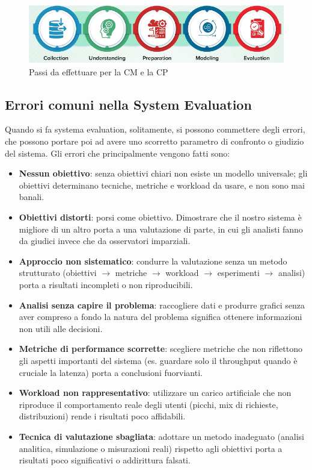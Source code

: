 \begin{figure}
    \includegraphics[width=.8\textwidth]{img/passi_CMCP.png}
    \centering
    \caption{Passi da effettuare per la CM e la CP}\label{img:passi}
\end{figure}

\subsection{Errori comuni nella System Evaluation}
Quando si fa systema evaluation, solitamente, si possono commettere degli errori, che possono portare poi ad avere uno scorretto parametro di confronto o giudizio del sistema. Gli errori che principalmente vengono fatti sono:
\begin{itemize}
  \item \textbf{Nessun obiettivo}: senza obiettivi chiari non esiste un modello universale; 
  gli obiettivi determinano tecniche, metriche e workload da usare, e non sono mai banali.
  
  \item \textbf{Obiettivi distorti}: porsi come obiettivo. Dimostrare che il nostro sistema è 
  migliore di un altro porta a una valutazione di parte, in cui gli analisti fanno da giudici invece che da osservatori imparziali.
  
  \item \textbf{Approccio non sistematico}: condurre la valutazione senza un metodo strutturato 
  (obiettivi $\rightarrow$ metriche $\rightarrow$ workload $\rightarrow$ esperimenti $\rightarrow$ analisi) 
  porta a risultati incompleti o non riproducibili.
  
  \item \textbf{Analisi senza capire il problema}: raccogliere dati e produrre grafici senza 
  aver compreso a fondo la natura del problema significa ottenere informazioni non utili alle decisioni.
  
  \item \textbf{Metriche di performance scorrette}: scegliere metriche che non riflettono gli 
  aspetti importanti del sistema (es. guardare solo il throughput quando è cruciale la latenza) porta a conclusioni fuorvianti.
  
  \item \textbf{Workload non rappresentativo}: utilizzare un carico artificiale che non riproduce 
  il comportamento reale degli utenti (picchi, mix di richieste, distribuzioni) rende i risultati poco affidabili.
  
  \item \textbf{Tecnica di valutazione sbagliata}: adottare un metodo inadeguato (analisi analitica, simulazione o misurazioni reali) 
  rispetto agli obiettivi porta a risultati poco significativi o addirittura falsati.
\end{itemize}


